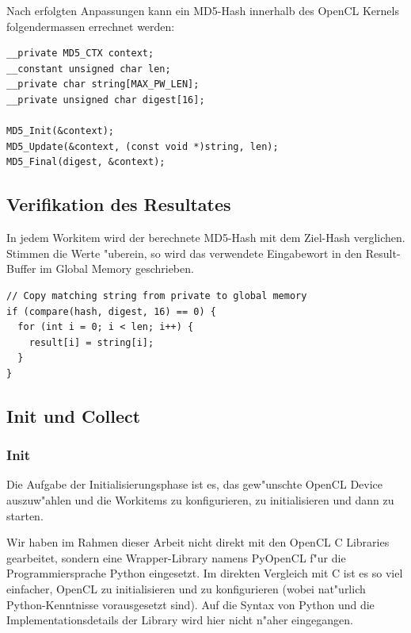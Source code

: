 \begin{refsection}
Nach erfolgten Anpassungen kann ein MD5-Hash innerhalb des OpenCL Kernels
folgendermassen errechnet werden:

\begin{small}
\begin{verbatim}
__private MD5_CTX context;
__constant unsigned char len;
__private char string[MAX_PW_LEN];
__private unsigned char digest[16];

MD5_Init(&context);
MD5_Update(&context, (const void *)string, len);
MD5_Final(digest, &context);
\end{verbatim}
\end{small}

\subsection{Verifikation des Resultates}
\label{crypto:verifikation}

In jedem Workitem wird der berechnete MD5-Hash mit dem Ziel-Hash verglichen.
Stimmen die Werte "uberein, so wird das verwendete Eingabewort in den
Result-Buffer im Global Memory geschrieben.

\begin{small}
\begin{verbatim}
// Copy matching string from private to global memory
if (compare(hash, digest, 16) == 0) {
  for (int i = 0; i < len; i++) {
    result[i] = string[i];
  }
}
\end{verbatim}
\end{small}

\subsection{Init und Collect}

\subsubsection{Init}

Die Aufgabe der Initialisierungsphase ist es, das gew"unschte OpenCL Device
auszuw"ahlen und die Workitems zu konfigurieren, zu initialisieren und dann zu
starten.

Wir haben im Rahmen dieser Arbeit nicht direkt mit den OpenCL C Libraries
gearbeitet, sondern eine Wrapper-Library namens
PyOpenCL\cite{crypto:pyopencl_docs} f"ur die Programmiersprache
Python\cite{crypto:python} eingesetzt. Im direkten Vergleich mit C ist es so viel
einfacher, OpenCL zu initialisieren und zu konfigurieren (wobei nat"urlich
Python-Kenntnisse vorausgesetzt sind). Auf die Syntax von Python und die
Implementationsdetails der Library wird hier nicht n"aher eingegangen.


\end{refsection}
